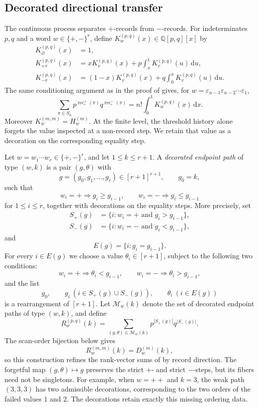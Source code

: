 \documentclass[10pt,a4paper]{amsart}
\DeclareMathOperator{\rec}{rec}
\newcommand{\dd}{\,\mathrm{d}}
\newcommand{\eps}{\varepsilon}
\begin{document}
\subsection{Decorated directional transfer}

The continuous process separates \(+\)-records from \(-\)-records.  For
indeterminates \(p,q\) and a word \(w\in\{+,-\}^r\), define
\(K_w^{(p,q)}(x)\in\mathbb Q[p,q][x]\) by
\begin{align*}
K_\varnothing^{(p,q)}(x)&=1,\\
K_{+v}^{(p,q)}(x)
&=xK_v^{(p,q)}(x)+p\int_x^1K_v^{(p,q)}(u)\dd u,\\
K_{-v}^{(p,q)}(x)
&=(1-x)K_v^{(p,q)}(x)+q\int_0^xK_v^{(p,q)}(u)\dd u.
\end{align*}
The same conditioning argument as in the proof of
 gives, for
\(w=\eps_{n-1}\eps_{n-2}\cdots\eps_1\),
\[
\sum_{\pi\in S_n}
p^{\rec_\eps^+(\pi)}q^{\rec_\eps^-(\pi)}
=
n!\int_0^1K_w^{(p,q)}(x)\dd x.
\]
Moreover \(K_w^{(m,m)}=H_w^{(m)}\).  At the finite level, the threshold
history alone forgets the value inspected at a non-record step.  We retain
that value as a decoration on the corresponding equality step.

Let \(w=w_1\cdots w_r\in\{+,-\}^r\), and let \(1\le k\le r+1\).  A
\emph{decorated endpoint path} of type \((w,k)\) is a pair \((g,\theta)\)
with
\[
g=(g_0,g_1,\ldots,g_r)\in[r+1]^{r+1},
\qquad g_0=k,
\]
such that
\[
w_i=+\Longrightarrow g_i\ge g_{i-1},
\qquad
w_i=-\Longrightarrow g_i\le g_{i-1}
\]
for \(1\le i\le r\), together with decorations on the equality steps.  More
precisely, set
\[
\begin{aligned}
S_+(g)&=\{i:w_i=+\text{ and }g_i>g_{i-1}\},\\
S_-(g)&=\{i:w_i=-\text{ and }g_i<g_{i-1}\},
\end{aligned}
\]
and
\[
E(g)=\{i:g_i=g_{i-1}\}.
\]
For every \(i\in E(g)\) we choose a value \(\theta_i\in[r+1]\), subject to
the following two conditions:
\[
w_i=+\Longrightarrow \theta_i<g_{i-1},
\qquad
w_i=-\Longrightarrow \theta_i>g_{i-1},
\]
and the list
\[
g_0,\qquad
g_i\ (i\in S_+(g)\cup S_-(g)),\qquad
\theta_i\ (i\in E(g))
\]
is a rearrangement of \([r+1]\).  Let \(\mathcal M_w(k)\) denote the set of
decorated endpoint paths of type \((w,k)\), and define
\[
R_w^{(p,q)}(k)
=
\sum_{(g,\theta)\in\mathcal M_w(k)}
p^{|S_+(g)|}q^{|S_-(g)|}.
\]
The scan-order bijection below gives
\[
R_w^{(m,m)}(k)=D_w^{(m)}(k),
\]
so this construction refines the rank-vector sums of
 by record direction.
The forgetful map \((g,\theta)\mapsto g\) preserves the strict \(+\)- and
strict \(-\)-steps, but its fibers need not be singletons.  For example, when
\(w=++\) and \(k=3\), the weak path \((3,3,3)\) has two admissible
decorations, corresponding to the two orders of the failed values \(1\) and
\(2\).  The decorations retain exactly this missing ordering data.
\end{document}
